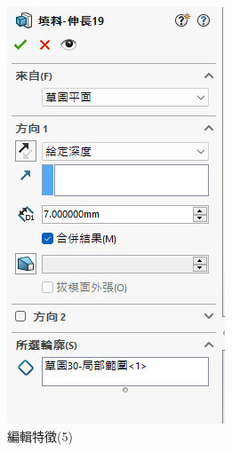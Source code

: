 \begin{figure}[h!]
\begin{minipage}[b]{0.35\textwidth}
        \includegraphics[width=\textwidth,height=0.35\textheight]{./../images/6-1-34} 
        \caption{編輯特徵(5)}
        \label{fig:feature1}
    \end{minipage}
\end{figure}

\newpage

